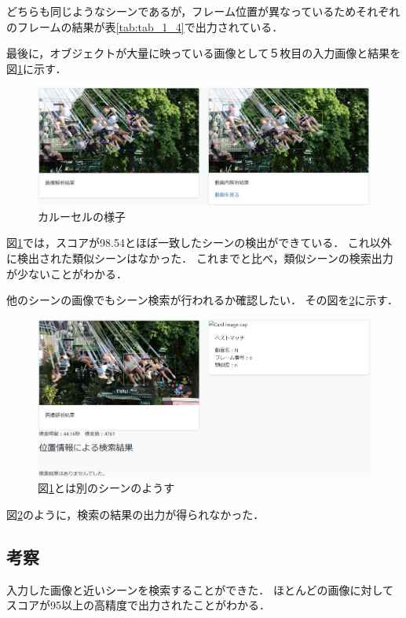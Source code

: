 \documentclass[a4j,12pt,dvipdfmx]{jreport}
\begin{document}
どちらも同じようなシーンであるが，フレーム位置が異なっているためそれぞれのフレームの結果が表\ref{tab:tab_1_4}で出力されている．

最後に，オブジェクトが大量に映っている画像として５枚目の入力画像と結果を図\ref{fig:img_1_5}に示す．
\begin{figure}[H]
  \centering
  \includegraphics[width=13cm]{image/result_1_5.jpg}
  \caption{カルーセルの様子}
  \label{fig:img_1_5}
\end{figure}

図\ref{fig:img_1_5}では，スコアが98.54とほぼ一致したシーンの検出ができている．
これ以外に検出された類似シーンはなかった．
これまでと比べ，類似シーンの検索出力が少ないことがわかる．

他のシーンの画像でもシーン検索が行われるか確認したい．
その図を\ref{fig:img_1_5_1}に示す．
\begin{figure}[H]
  \centering
  \includegraphics[width=13cm]{image/result_1_5_1.jpg}
  \caption{図\ref{fig:img_1_5}とは別のシーンのようす}
  \label{fig:img_1_5_1}
\end{figure}

図\ref{fig:img_1_5_1}のように，検索の結果の出力が得られなかった．

\subsection{考察}
入力した画像と近いシーンを検索することができた．
ほとんどの画像に対してスコアが95以上の高精度で出力されたことがわかる．
\end{document}
